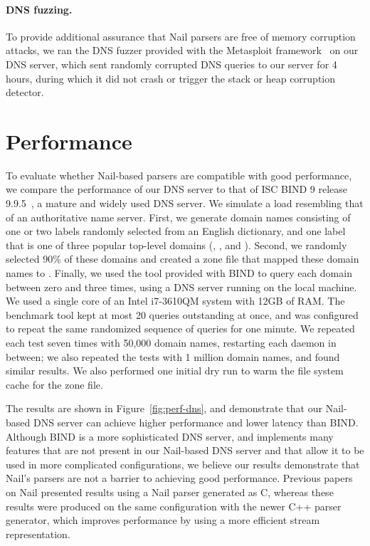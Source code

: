 \paragraph{DNS fuzzing.}

To provide additional assurance that Nail parsers are free of memory
corruption attacks, we ran the DNS fuzzer provided with the Metasploit
framework~\cite{mspframework} on our DNS server, which sent randomly
corrupted DNS queries to our server for 4 hours, during which it did
not crash or trigger the stack or heap corruption detector.


\section{Performance}

To evaluate whether Nail-based parsers are compatible with good
performance, we compare the performance of our DNS server to that of ISC
BIND 9 release 9.9.5~\cite{bind9}, a mature and widely used DNS server.
We simulate a load resembling that of an authoritative name server.
First, we generate domain names consisting of one or two labels randomly
selected from an English dictionary, and one label that is one of
three popular top-level domains (, , and ).
Second, we randomly selected 90\% of these domains and created a zone
file that mapped these domain names to .  Finally, we used
the  tool provided with BIND to query each domain between
zero and three times, using a DNS server running on the local machine.
We used a single core of an Intel i7-3610QM system with 12GB of RAM\@.
The benchmark tool kept at most 20 queries outstanding at once, and
was configured to repeat the same randomized sequence of queries for
one minute.  We repeated each test seven times with 50,000 domain names,
restarting each daemon in between; we also repeated the tests with 1
million domain names, and found similar results.  We also performed one
initial dry run to warm the file system cache for the zone file.

The results are shown in Figure~\ref{fig:perf-dns}, and demonstrate
that our Nail-based DNS server can achieve higher performance and
lower latency than BIND\@.  Although BIND is a more sophisticated DNS
server, and implements many features that are not present in our
Nail-based DNS server and that allow it to be used in more complicated
configurations, we believe our results demonstrate that Nail's parsers
are not a barrier to achieving good performance.  Previous papers on
Nail presented results using a Nail parser generated as C, whereas
these results were produced on the same configuration with the newer
C++ parser generator, which improves performance by using a more
efficient stream representation.


